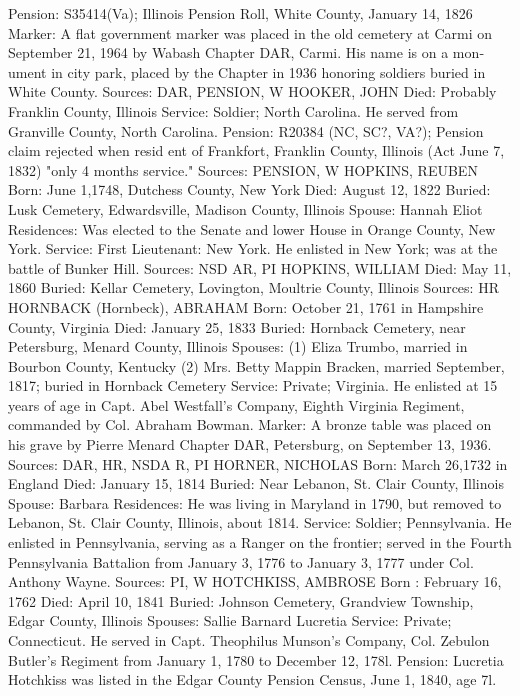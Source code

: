 Pension: S35414(Va); Illinois Pension Roll, White County, January 14, 1826 
Marker: A flat government marker was placed in the old cemetery at Carmi on September 21, 1964 by Wabash Chapter DAR, Carmi. His name is on a mon­ument in city park, placed by the Chapter in 1936 honoring soldiers buried in White County. 
Sources: DAR, PENSION, W 
HOOKER, JOHN 
Died: Probably Franklin County, Illinois  
Service: Soldier; North Carolina. He served from Granville County, North Carolina. 
Pension: R20384 (NC, SC?, VA?); Pension claim rejected when resid ent of Frank­fort, Franklin County, Illinois (Act June 7, 1832) "only 4 months service." 
Sources: PENSION, W 
HOPKINS, REUBEN 
Born: June 1,1748, Dutchess County, New York 
Died: August 12, 1822 
Buried: Lusk Cemetery, Edwardsville, Madison County, Illinois 
Spouse: Hannah Eliot 
Residences: Was elected to the Senate and lower House in Orange County, New York. Service: First Lieutenant: New York. He enlisted in New York; was at the battle of Bunker Hill. 
Sources: NSD AR, PI 
HOPKINS, WILLIAM 
Died: May 11, 1860 
Buried: Kellar Cemetery, Lovington, Moultrie County, Illinois 
Sources: HR 
HORNBACK (Hornbeck), ABRAHAM 
Born: October 21, 1761 in Hampshire County, Virginia 
Died: January 25, 1833 
Buried: Hornback Cemetery, near Petersburg, Menard County, Illinois 
Spouses: (1) Eliza Trumbo, married in Bourbon County, Kentucky 
	 (2) Mrs. Betty Mappin Bracken, married September, 1817; buried in Hornback Cemetery 
Service: Private; Virginia. He enlisted at 15 years of age in Capt. Abel Westfall's Company, Eighth Virginia Regiment, commanded by Col. Abraham Bowman. 
Marker: A bronze table was placed on his grave by Pierre Menard Chapter DAR, Petersburg, on September 13, 1936. 
Sources: DAR, HR, NSDA R, PI 
HORNER, NICHOLAS 
Born: March 26,1732 in England 
Died: January 15, 1814 
Buried: Near Lebanon, St. Clair County, Illinois 
Spouse: Barbara Residences: He was living in Maryland in 1790, but removed to Lebanon, St. Clair County, Illinois, about 1814. 
Service: Soldier; Pennsylvania. He enlisted in Pennsylvania, serving as a Ranger on the frontier; served in the Fourth Pennsylvania Battalion from January 3, 1776 to January 3, 1777 under Col. Anthony Wayne. 
Sources: PI, W 
HOTCHKISS, AMBROSE 
Born : February 16, 1762 
Died: April 10, 1841 Buried: Johnson Cemetery, Grandview Township, Edgar County, Illinois 
Spouses: Sallie Barnard 
	 Lucretia
Service: Private; Connecticut. He served in Capt. Theophilus Munson's Company, Col. Zebulon Butler's Regiment from January 1, 1780 to December 12, 178l. 
Pension: Lucretia Hotchkiss was listed in the Edgar County Pension Census, June 1, 1840, age 7l. 
